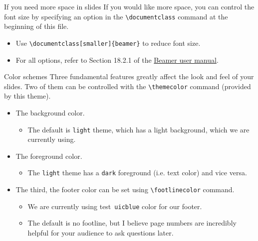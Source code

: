 \documentclass{beamer}
\newcommand{\hrefcol}[2]{\textcolor{uihteal}{\href{#1}{#2}}}
\newcommand{\testcolor}[1]{\colorbox{#1}{\textcolor{#1}{test}}~\texttt{#1}}
\begin{document}
\begin{frame}[fragile]{If you need more space in slides}
If you would like more space, you can control the font size by specifying an option in the \verb|\documentclass| command at the beginning of this file.
\begin{itemize}
    \item Use \verb|\documentclass[smaller]{beamer}| to reduce font size.
    \item For all options, refer to Section 18.2.1 of the \hrefcol{https://www.ctan.org/tex-archive/macros/latex/contrib/beamer/doc/beameruserguide.pdf}{Beamer user manual}.
\end{itemize}
\end{frame}


\begin{frame}[fragile]{Color schemes}
Three fundamental features greatly affect the look and feel of your slides. Two of them can be controlled with the \verb|\themecolor| command (provided by this theme).
\begin{itemize}
\item The background color.
\begin{itemize}
    \item The default is \verb|light| theme, which has a light background, which we are currently using.
\end{itemize}
\item The foreground color.
\begin{itemize}
    \item The \verb|light| theme has a \verb|dark| foreground (i.e. text color) and vice versa.
\end{itemize}
\item The third, the footer color can be set using \verb|\footlinecolor| command.
\begin{itemize}
    \item We are currently using \testcolor{uicblue} color for our footer.
    \item The default is no footline, but I believe page numbers are incredibly helpful for your audience to ask questions later.
\end{itemize}
\end{itemize}
\end{frame}
\end{document}
